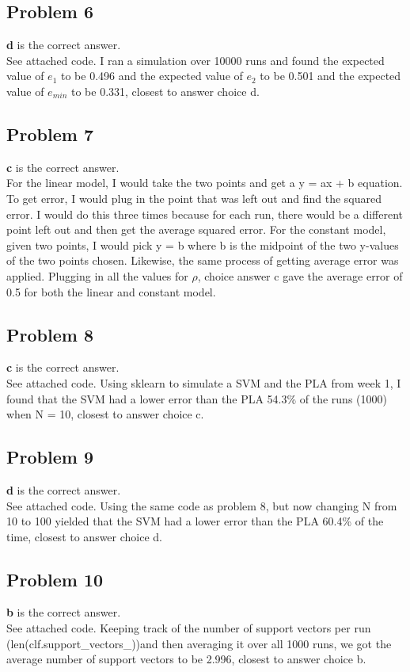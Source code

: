 \documentclass[12 pt]{article}
\begin{document}
	\subsection*{Problem 6}
	\textbf{d} is the correct answer. \\
	See attached code. I ran a simulation over 10000 runs and found the expected value of ${e_1}$ to be 0.496 and the expected value of ${e_2}$ to be 0.501 and the expected value of ${e_{min}}$ to be 0.331, closest to answer choice d.
		
	\subsection*{Problem 7}
	\textbf{c} is the correct answer. \\
	For the linear model, I would take the two points and get a y = ax + b equation. To get error, I would plug in the point that was left out and find the squared error. I would do this three times because for each run, there would be a different point left out and then get the average squared error. For the constant model, given two points, I would pick y = b where b is the midpoint of the two y-values of the two points chosen. Likewise, the same process of getting average error was applied. Plugging in all the values for $\rho$, choice answer c gave the average error of 0.5 for both the linear and constant model.
		
	
	\subsection*{Problem 8}
	\textbf{c} is the correct answer. \\
	See attached code. Using sklearn to simulate a SVM and the PLA from week 1, I found that the SVM had a lower error than the PLA 54.3\% of the runs (1000) when N = 10, closest to answer choice c. 

	
	\subsection*{Problem 9}
	\textbf{d} is the correct answer. \\
	See attached code. Using the same code as problem 8, but now changing N from 10 to 100 yielded that the SVM had a lower error than the PLA 60.4\% of the time, closest to answer choice d.
	
	\subsection*{Problem 10}
	\textbf{b} is the correct answer. \\
	See attached code. Keeping track of the number of support vectors per run (len(clf.support\_vectors\_))and then averaging it over all 1000 runs, we got the average number of support vectors to be 2.996, closest to answer choice b.
	
\end{document}
